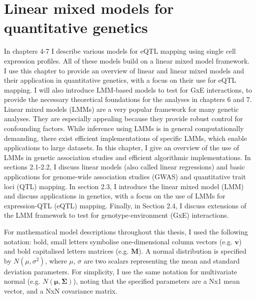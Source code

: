 
\chapter{Linear mixed models for quantitative genetics}

In chapters 4-7 I describe various models for eQTL mapping using single cell expression profiles. 
All of these models build on a linear mixed model framework. 
I use this chapter to provide an overview of linear and linear mixed models and their application in quantitative genetics, with a focus on their use for eQTL mapping. 
I will also introduce LMM-based models to test for GxE interactions, to provide the necessary theoretical foundations for the analyses in chapters 6 and 7.\\

Linear mixed models (LMMs) are a very popular framework for many genetic analyses. 
They are especially appealing because they provide robust control for confounding factors. 
While inference using LMMs is in general computationally demanding, there exist efficient implementations of specific LMMs, which enable applications to large datasets. 
In this chapter, I give an overview of the use of LMMs in genetic association studies and efficient algorithmic implementations. 
In sections 2.1-2.2, I discuss linear models (also called linear regressions) and basic applications for genome-wide association studies (GWAS) and quantitative trait loci (QTL) mapping. 
In section 2.3, I introduce the linear mixed model (LMM) and discuss applications in genetics, with a focus on the use of LMMs for expression-QTL (eQTL) mapping. 
Finally, in Section 2.4, I discuss extensions of the LMM framework to test for genotype-environment (GxE) interactions.\\

\newpage

For mathematical model descriptions throughout this thesis, I used the following notation: bold, small letters symbolise one-dimensional column vectors (e.g. $\mathbf{v}$) and bold capitalised letters matrices (e.g. $\mathbf{M}$). 
A normal distribution is specified by $ N(\mu, \sigma^2)$, where $\mu$, $\sigma$ are two scalars representing the mean and standard deviation parameters.
For simplicity, I use the same notation for multivariate normal (e.g. $ N(\boldsymbol{\mu}, \boldsymbol{\Sigma})$), noting that the specified parameters are a Nx1 mean vector, and a  NxN covariance matrix.

